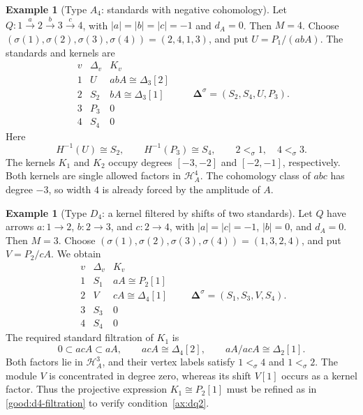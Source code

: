 \documentclass[11pt,a4paper]{article}
\renewcommand{\H}{\mathcal H}
\newcommand{\std}{\Delta}
\theoremstyle{plain}
\theoremstyle{definition}
\newtheorem{example}[theorem]{Example}
\numberwithin{equation}{section}
\begin{document}
\begin{example}[Type $A_4$: standards with negative cohomology]
\label{good:a4}
Let $Q:1\xrightarrow{a}2\xrightarrow{b}3\xrightarrow{c}4$, with
$|a|=|b|=|c|=-1$ and $d_A=0$. Then $M=4$.
Choose $(\sigma(1),\sigma(2),\sigma(3),\sigma(4))=(2,4,1,3)$,
and put $U=P_1/(abA)$. The standards and kernels are
\begin{equation}\label{good:a4-table}
 \begin{array}{c|c|c}
 v&\std_v&K_v\\\hline
 1&U&abA\cong\std_3[2]\\
 2&S_2&bA\cong\std_3[1]\\
 3&P_3&0\\
 4&S_4&0
 \end{array}
 \qquad
 \boldsymbol\std^\sigma=(S_2,S_4,U,P_3).
\end{equation}
Here
\[
 H^{-1}(U)\cong S_2,\qquad H^{-1}(P_3)\cong S_4,
 \qquad 2<_\sigma1,\quad4<_\sigma3.
\]
The kernels $K_1$ and $K_2$ occupy degrees $[-3,-2]$ and
$[-2,-1]$, respectively. Both kernels are single allowed factors in
$\H_A^4$. The cohomology class of $abc$ has degree $-3$, so width
$4$ is already forced by the amplitude of $A$.
\end{example}

\begin{example}[Type $D_4$: a kernel filtered by shifts of two standards]
\label{good:d4}
Let $Q$ have arrows $a:1\to2$, $b:2\to3$, and $c:2\to4$, with
$|a|=|c|=-1$, $|b|=0$, and $d_A=0$. Then $M=3$.
Choose $(\sigma(1),\sigma(2),\sigma(3),\sigma(4))=(1,3,2,4)$,
and put $V=P_2/cA$. We obtain
\begin{equation}\label{good:d4-table}
 \begin{array}{c|c|c}
 v&\std_v&K_v\\\hline
 1&S_1&aA\cong P_2[1]\\
 2&V&cA\cong\std_4[1]\\
 3&S_3&0\\
 4&S_4&0
 \end{array}
 \qquad
 \boldsymbol\std^\sigma=(S_1,S_3,V,S_4).
\end{equation}
The required standard filtration of $K_1$ is
\begin{equation}\label{good:d4-filtration}
 0\subset acA\subset aA,\qquad
 acA\cong\std_4[2],\qquad aA/acA\cong\std_2[1].
\end{equation}
Both factors lie in $\H_A^3$, and their vertex labels satisfy
$1<_\sigma4$ and $1<_\sigma2$. The module $V$ is concentrated in
degree zero, whereas its
shift $V[1]$ occurs as a kernel factor. Thus the projective expression
$K_1\cong P_2[1]$ must be refined as in
\eqref{good:d4-filtration} to verify condition~\ref{ax:dq2}.
\end{example}
\end{document}
